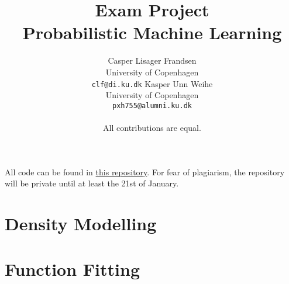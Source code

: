 \documentclass{article}
\title{
  Exam Project\\
  Probabilistic Machine Learning
}
\author{Casper Lisager Frandsen\\
  University of Copenhagen\\
  \texttt{clf@di.ku.dk}
  \AND           %
  Kasper Unn Weihe\\
  University of Copenhagen\\
  \texttt{pxh755@alumni.ku.dk}\\\\
  All contributions are equal.
}
\begin{document}
\maketitle



\appendix %

All code can be found in \href{https://github.com/Cavtheman/pml}{this repository}. For fear of plagiarism, the repository will be private until at least the 21st of January.
\section{Density Modelling}


\section{Function Fitting}








\end{document}
